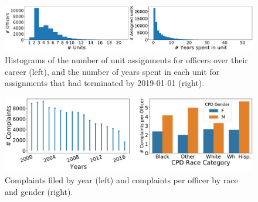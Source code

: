 \begin{figure}[t!] 
	\includegraphics[width=\textwidth]{figs/units_officers.pdf} 
	\caption{Histograms of the number of unit assignments for
officers over their career (left), and the number of years spent in each unit for assignments that had terminated by 2019-01-01 (right).}
\label{fig:units}
\end{figure}


\begin{figure}[t!] 
	\includegraphics[width=\textwidth]{figs/complaints_years_race_gender.pdf} 
	\caption{Complaints filed by year (left) and complaints per officer by race and gender (right).} \label{fig:complaints}
\end{figure}

